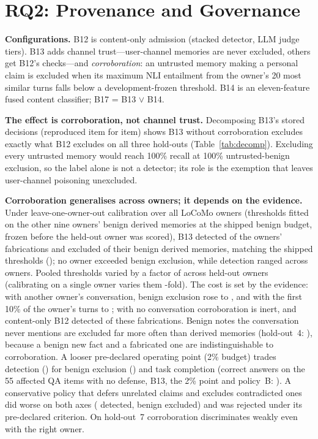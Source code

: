 \documentclass[conference,compsoc]{IEEEtran}
\begin{document}


\section{RQ2: Provenance and Governance}\label{sec:prov}
\textbf{Configurations.} B12 is content-only admission (stacked detector, LLM judge tiers). B13 adds channel trust---user-channel memories are never excluded, others get B12's checks---and \emph{corroboration}: an untrusted memory making a personal claim is excluded when its maximum NLI entailment from the owner's 20 most similar turns falls below a development-frozen threshold. B14 is an eleven-feature fused content classifier; B17 = B13 $\lor$ B14.



\textbf{The effect is corroboration, not channel trust.} Decomposing B13's stored decisions (reproduced item for item) shows B13 without corroboration excludes exactly what B12 excludes on all three hold-outs (Table~\ref{tab:decomp}). Excluding every untrusted memory would reach 100\% recall at 100\% untrusted-benign exclusion, so the label alone is not a detector; its role is the exemption that leaves user-channel poisoning unexcluded.



\textbf{Corroboration generalises across owners; it depends on the evidence.} Under leave-one-owner-out calibration over all \LooOwners{} LoCoMo owners (thresholds fitted on the other nine owners' benign derived memories at the shipped benign budget, frozen before the held-out owner was scored), B13 detected \LooDet{} of the owners' fabrications and excluded \LooBen{} of their benign derived memories, matching the shipped thresholds (\LooFrozenDet{}); no owner exceeded \LooBenMax{} benign exclusion, while detection ranged \LooDetRange{} across owners. Pooled thresholds varied by a factor of \LooThrRatio{} across held-out owners (calibrating on a single owner varies them \LooSingleRatio{}-fold). The cost is set by the evidence: with another owner's conversation, benign exclusion rose to \LooWrongBen{}, and with the first 10\% of the owner's turns to \LooTruncBen{}; with no conversation corroboration is inert, and content-only B12 detected \LooBtwelveDet{} of these fabrications. Benign notes the conversation never mentions are excluded far more often than derived memories (hold-out~4: \LooHOfour{}), because a benign new fact and a fabricated one are indistinguishable to corroboration. A looser pre-declared operating point (2\% budget) trades detection (\LooNomDet{}) for benign exclusion (\LooNomBen{}) and task completion (correct answers on the 55 affected QA items with no defense, B13, the 2\% point and policy~B: \LooUtil{}). A conservative policy that defers unrelated claims and excludes contradicted ones did worse on both axes (\LooPolicyBDet{} detected, \LooPolicyBBen{} benign excluded) and was rejected under its pre-declared criterion. On hold-out~7 corroboration discriminates weakly even with the right owner.
\end{document}
